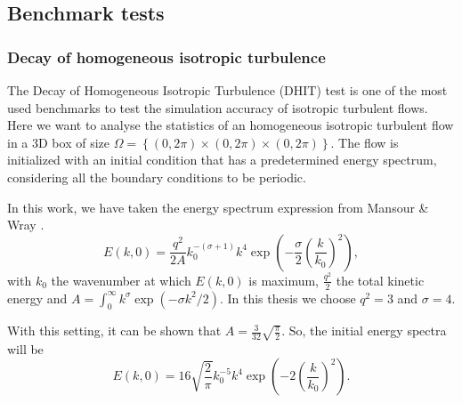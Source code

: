 \subsection{Benchmark tests}
\label{subsec-isotropic_tests}

\subsubsection{Decay of homogeneous isotropic turbulence}
The Decay of Homogeneous Isotropic Turbulence (DHIT) test is one of the most used benchmarks to test the simulation accuracy of isotropic turbulent flows. Here we want to analyse the statistics of an homogeneous isotropic turbulent flow in a 3D box of size $\Omega=\left\{(0,2\pi)\times(0,2\pi)\times(0,2\pi)\right\}$. The flow is initialized with an initial condition that has a predetermined energy spectrum, considering all the boundary conditions to be periodic.

In this work, we have taken the energy spectrum expression from Mansour \& Wray \cite{mansour_decay_1994}.
\begin{equation}
\label{eq-DHIT_init_spectrum}
E(k,0)=\frac{q^2}{2A}k_0^{-(\sigma+1)}k^4\exp\left(-\frac{\sigma}{2}\left(\frac{k}{k_0}\right)^2\right),
\end{equation}
with $k_0$ the wavenumber at which $E(k,0)$ is maximum, $\frac{q^2}{2}                                                                                                                                                                                                                  $ the total kinetic energy and $A=\int_0^\infty k^\sigma\exp(-\sigma k^2/2)$. In this thesis we choose $q^2=3$ and $\sigma=4$.

With this setting, it can be shown that $A=\frac{3}{32}\sqrt{\frac{\pi}{2}}$. So, the initial energy spectra will be
\begin{equation}
\label{eq-DHIT_init_spectrum2}
E(k,0)=16\sqrt{\frac{2}{\pi}}k_0^{-5}k^4\exp\left(-2\left(\frac{k}{k_0}\right)^2\right).
\end{equation}

